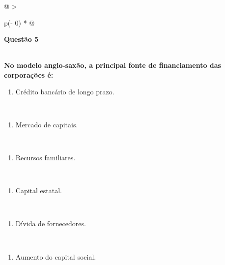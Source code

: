 \documentclass[
]{book}
\providecommand{\tightlist}{%
  \setlength{\itemsep}{0pt}\setlength{\parskip}{0pt}}
\begin{document}
\begin{longtable}[]{@{}
  >{\raggedright\arraybackslash}p{(\columnwidth - 0\tabcolsep) * }@{}}
\toprule\noalign{}
\begin{minipage}[b]{\linewidth}\raggedright
\textbf{Questão 5}
\end{minipage} \\
\midrule\noalign{}
\endhead
\bottomrule\noalign{}
\endlastfoot
\textbf{No modelo anglo-saxão, a principal fonte de financiamento das corporações é:} \\
\begin{minipage}[t]{\linewidth}\raggedright
\begin{enumerate}
\def\labelenumi{\alph{enumi})}
\tightlist
\item
  Crédito bancário de longo prazo.
\end{enumerate}
\end{minipage} \\
\begin{minipage}[t]{\linewidth}\raggedright
\begin{enumerate}
\def\labelenumi{\alph{enumi})}
\setcounter{enumi}{1}
\tightlist
\item
  Mercado de capitais.
\end{enumerate}
\end{minipage} \\
\begin{minipage}[t]{\linewidth}\raggedright
\begin{enumerate}
\def\labelenumi{\alph{enumi})}
\setcounter{enumi}{2}
\tightlist
\item
  Recursos familiares.
\end{enumerate}
\end{minipage} \\
\begin{minipage}[t]{\linewidth}\raggedright
\begin{enumerate}
\def\labelenumi{\alph{enumi})}
\setcounter{enumi}{3}
\tightlist
\item
  Capital estatal.
\end{enumerate}
\end{minipage} \\
\begin{minipage}[t]{\linewidth}\raggedright
\begin{enumerate}
\def\labelenumi{\alph{enumi})}
\setcounter{enumi}{4}
\tightlist
\item
  Dívida de fornecedores.
\end{enumerate}
\end{minipage} \\
\begin{minipage}[t]{\linewidth}\raggedright
\begin{enumerate}
\def\labelenumi{\alph{enumi})}
\setcounter{enumi}{4}
\tightlist
\item
  Aumento do capital social.
\end{enumerate}
\end{minipage} \\
\end{longtable}
\end{document}
